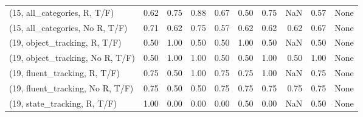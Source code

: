 \begin{table*}[h!]
\begin{adjustbox}{width=2\columnwidth,center}
\begin{tabular}{lrrr|rrr|rrr}
(15, all\_categories, R, T/F)          &                      0.62 &                  0.75 &                      0.88 &                          0.67 &                      0.50 &                          0.75 &                                    NaN &                               0.57 &                                  None \\
(15, all\_categories, No R, T/F)       &                      0.71 &                  0.62 &                      0.75 &                          0.57 &                      0.62 &                          0.62 &                                   0.62 &                               0.67 &                                  None \\



\midrule
(19, object\_tracking, R, T/F)         &                      0.50 &                  1.00 &                      0.50 &                          0.50 &                      1.00 &                          0.50 &                                    NaN &                               0.50 &                                  None \\
(19, object\_tracking, No R, T/F)      &                      0.50 &                  1.00 &                      1.00 &                          0.50 &                      0.50 &                          1.00 &                                   0.50 &                               1.00 &                                  None \\
(19, fluent\_tracking, R, T/F)         &                      0.75 &                  0.50 &                      1.00 &                          0.75 &                      0.75 &                          1.00 &                                    NaN &                               0.75 &                                  None \\
(19, fluent\_tracking, No R, T/F)      &                      0.75 &                  0.50 &                      0.50 &                          0.75 &                      0.75 &                          0.75 &                                   0.75 &                               0.75 &                                  None \\
(19, state\_tracking, R, T/F)          &                      1.00 &                  0.00 &                      0.00 &                          0.00 &                      0.50 &                          0.00 &                                    NaN &                               0.50 &                                  None \\

\end{tabular}
\end{adjustbox}
\end{table*}
